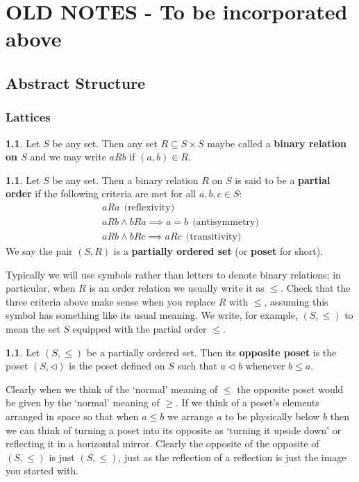 \documentclass[oneside,english]{amsbook}
\numberwithin{section}{chapter}
\theoremstyle{plain}
\theoremstyle{definition}
\newtheorem{defn}[thm]{\protect\definitionname}
\providecommand{\definitionname}{Definition}
\begin{document}
\part{OLD NOTES - To be incorporated above}

\chapter{Abstract Structure}

\section{Lattices} 

\begin{defn} 
	Let $S$ be any set. Then any set $R\subseteq S\times S$ maybe called a \textbf{binary relation on $S$} and we may write $aRb$ if $(a,b)\in R$. 
\end{defn}


\begin{defn} 
	Let $S$ be any set. Then a binary relation $R$ on $S$ is said to be a \textbf{partial order }if the following criteria are met for all $a,b,c\in S$: 
	\begin{eqnarray*} 
		aRa\ \ \text{(reflexivity)}\\ 
		aRb\land bRa\implies a=b\ \ \text{(antisymmetry)}\\ 
		aRb\land bRc\implies aRc\ \ \text{(transitivity)} 
	\end{eqnarray*}
	 We say the pair $(S,R)$ is a \textbf{partially ordered set} (or \textbf{poset }for short). 
\end{defn} 

Typically we will use symbols rather than letters to denote binary relations; in particular, when $R$ is an order relation we usually write it as $\le$. Check that the three criteria above make sense when you replace $R$ with $\le$, assuming this symbol has something like its usual meaning. We write, for example, $(S,\le)$ to mean the set $S$ equipped with the partial order $\le$. 

\begin{defn} 
	Let $(S,\le)$ be a partially ordered set. Then its \textbf{opposite poset} is the poset $(S,\lhd)$ is the poset defined on $S$ such that $a\lhd b$ whenever $b\le a$. 
\end{defn} 

Clearly when we think of the `normal' meaning of $\le$ the opposite poset would be given by the `normal' meaning of $\ge$. If we think of a poset's elements arranged in space so that when $a\le b$ we arrange $a$ to be physically below $b$ then we can think of turning a poset into its opposite as `turning it upside down' or reflecting it in a horizontal mirror. Clearly the opposite of the opposite of $(S,\le)$ is just $(S,\le)$, just as the reflection of a reflection is just the image you started with. 
\end{document}
